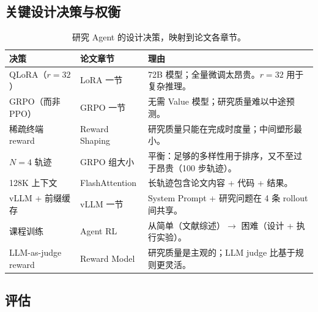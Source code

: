 \subsection{关键设计决策与权衡}
\label{key-design-decisions-and-tradeoffs}

\begin{table}[ht!]
\centering\small
\caption{研究 Agent 的设计决策，映射到论文各章节。}
\noindent\begin{tabularx}{\linewidth}{@{}l Z{0.45} Z{1.55}@{}}
\toprule
\textbf{决策} & \textbf{论文章节} & \textbf{理由} \\
\midrule
QLoRA（$r=32$） & LoRA 一节 & 72B 模型；全量微调太昂贵。$r=32$ 用于复杂推理。 \\
GRPO（而非 PPO） & GRPO 一节 & 无需 Value 模型；研究质量难以中途预测。 \\
稀疏终端 reward & Reward Shaping & 研究质量只能在完成时度量；中间塑形最小。 \\
$N=4$ 轨迹 & GRPO 组大小 & 平衡：足够的多样性用于排序，又不至过于昂贵（100 步轨迹）。 \\
128K 上下文 & FlashAttention & 长轨迹包含论文内容 + 代码 + 结果。 \\
vLLM + 前缀缓存 & vLLM 一节 & System Prompt + 研究问题在 4 条 rollout 间共享。 \\
课程训练 & Agent RL & 从简单（文献综述）$\to$ 困难（设计 + 执行实验）。 \\
LLM-as-judge reward & Reward Model & 研究质量是主观的；LLM judge 比基于规则更灵活。 \\
\bottomrule
\end{tabularx}
\end{table}

\subsection{评估}
\label{evaluation-dup2}

